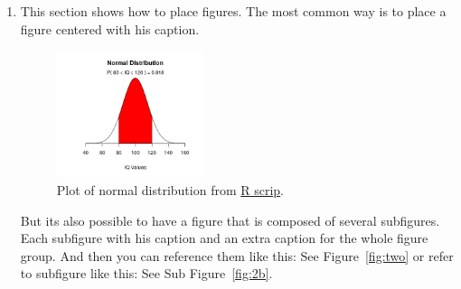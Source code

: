 \begin{enumerate}
 \item This section shows how to place figures.
 The most common way is to place a figure centered with his caption.
 
\begin{figure}[htb]
  \centering
  \label{fig:one}
  \includegraphics[width=0.4\textwidth]{img/normal}
  \caption{Plot of normal distribution from \href{https://www.statmethods.net/advgraphs/probability.html}{R scrip}.}
\end{figure}

But its also possible to have a figure that is composed of several subfigures.
Each subfigure with his caption and an extra caption for the whole figure group.
And then you can reference them like this: See Figure~\ref{fig:two} or refer to subfigure like this: See Sub Figure~\ref{fig:2b}.


\end{enumerate}
